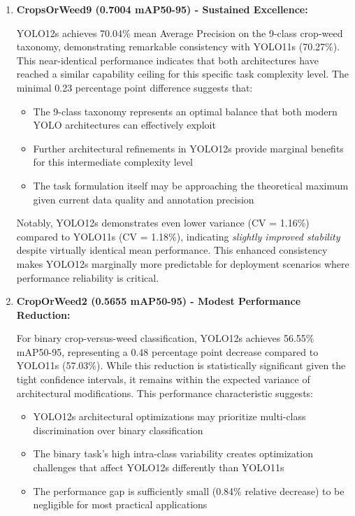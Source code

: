 \begin{enumerate}
    \item \textbf{CropsOrWeed9 (0.7004 mAP50-95) - Sustained Excellence:}
    
    YOLO12s achieves 70.04\% mean Average Precision on the 9-class crop-weed taxonomy, demonstrating remarkable consistency with YOLO11s (70.27\%). This near-identical performance indicates that both architectures have reached a similar capability ceiling for this specific task complexity level. The minimal 0.23 percentage point difference suggests that:
    
    \begin{itemize}
        \item The 9-class taxonomy represents an optimal balance that both modern YOLO architectures can effectively exploit
        \item Further architectural refinements in YOLO12s provide marginal benefits for this intermediate complexity level
        \item The task formulation itself may be approaching the theoretical maximum given current data quality and annotation precision
    \end{itemize}
    
    Notably, YOLO12s demonstrates even lower variance (CV = 1.16\%) compared to YOLO11s (CV = 1.18\%), indicating \textit{slightly improved stability} despite virtually identical mean performance. This enhanced consistency makes YOLO12s marginally more predictable for deployment scenarios where performance reliability is critical.
    
    \item \textbf{CropOrWeed2 (0.5655 mAP50-95) - Modest Performance Reduction:}
    
    For binary crop-versus-weed classification, YOLO12s achieves 56.55\% mAP50-95, representing a 0.48 percentage point decrease compared to YOLO11s (57.03\%). While this reduction is statistically significant given the tight confidence intervals, it remains within the expected variance of architectural modifications. This performance characteristic suggests:
    
    \begin{itemize}
        \item YOLO12s architectural optimizations may prioritize multi-class discrimination over binary classification
        \item The binary task's high intra-class variability creates optimization challenges that affect YOLO12s differently than YOLO11s
        \item The performance gap is sufficiently small (0.84\% relative decrease) to be negligible for most practical applications
    \end{itemize}
    

\end{enumerate}
